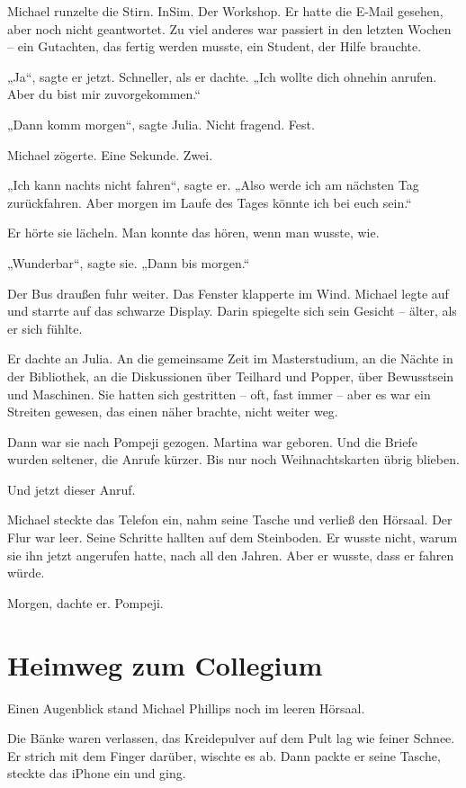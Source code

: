 \documentclass[
]{article}
\begin{document}
Michael runzelte die Stirn. InSim. Der Workshop. Er hatte die E-Mail gesehen, aber noch nicht geantwortet. Zu viel anderes war passiert in den letzten Wochen -- ein Gutachten, das fertig werden musste, ein Student, der Hilfe brauchte.

„Ja``, sagte er jetzt. Schneller, als er dachte. „Ich wollte dich ohnehin anrufen. Aber du bist mir zuvorgekommen.``

„Dann komm morgen``, sagte Julia. Nicht fragend. Fest.

Michael zögerte. Eine Sekunde. Zwei.

„Ich kann nachts nicht fahren``, sagte er. „Also werde ich am nächsten Tag zurückfahren. Aber morgen im Laufe des Tages könnte ich bei euch sein.``

Er hörte sie lächeln. Man konnte das hören, wenn man wusste, wie.

„Wunderbar``, sagte sie. „Dann bis morgen.``

Der Bus draußen fuhr weiter. Das Fenster klapperte im Wind. Michael legte auf und starrte auf das schwarze Display. Darin spiegelte sich sein Gesicht -- älter, als er sich fühlte.

Er dachte an Julia. An die gemeinsame Zeit im Masterstudium, an die Nächte in der Bibliothek, an die Diskussionen über Teilhard und Popper, über Bewusstsein und Maschinen. Sie hatten sich gestritten -- oft, fast immer -- aber es war ein Streiten gewesen, das einen näher brachte, nicht weiter weg.

Dann war sie nach Pompeji gezogen. Martina war geboren. Und die Briefe wurden seltener, die Anrufe kürzer. Bis nur noch Weihnachtskarten übrig blieben.

Und jetzt dieser Anruf.

Michael steckte das Telefon ein, nahm seine Tasche und verließ den Hörsaal. Der Flur war leer. Seine Schritte hallten auf dem Steinboden. Er wusste nicht, warum sie ihn jetzt angerufen hatte, nach all den Jahren. Aber er wusste, dass er fahren würde.

Morgen, dachte er. Pompeji.

\section{Heimweg zum Collegium}\label{heimweg-zum-collegium}

Einen Augenblick stand Michael Phillips noch im leeren Hörsaal.

Die Bänke waren verlassen, das Kreidepulver auf dem Pult lag wie feiner Schnee. Er strich mit dem Finger darüber, wischte es ab. Dann packte er seine Tasche, steckte das iPhone ein und ging.
\end{document}
